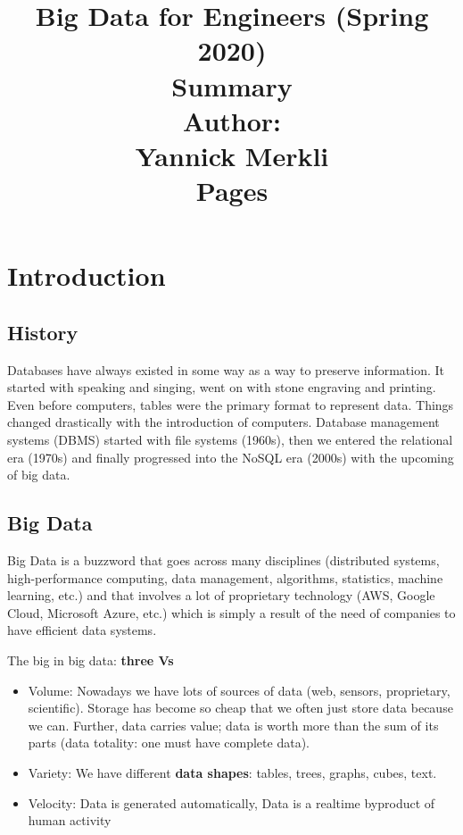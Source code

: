 \documentclass[11pt,oneside,a4paper]{article}
\title{
    \vspace*{0.0mm}
    \LARGE\bf\sf Big Data for Engineers (Spring 2020)
    \vspace*{10.0mm} \\
    \Huge\bf\sf Summary
    \vspace*{30.0mm} \\
    \normalsize
    \sf Author:\\[5pt]
    \sf Yannick Merkli\\ [5pt]
    \sf \pageref{lastpage} Pages
}
\date{}
\begin{document}
\maketitle
\thispagestyle{empty}
\raggedbottom
\clearpage


\clearpage
\setcounter{tocdepth}{2}
\tableofcontents
\clearpage
{}

\setlength\parindent{0pt}
\titlespacing{\subsection}{0pt}{2ex}{2ex}


\newpage

\section{Introduction}

\subsection{History}

Databases have always existed in some way as a way to preserve information. It started with speaking and singing, went on with stone engraving and printing. Even before computers, tables were the primary format to represent data. Things changed drastically with the introduction of computers. Database management systems (DBMS) started with file systems (1960s), then we entered the relational era (1970s) and finally progressed into the NoSQL era (2000s) with the upcoming of big data.

\subsection{Big Data}

Big Data is a buzzword that goes across many disciplines (distributed systems, high-performance computing, data management, algorithms, statistics, machine learning, etc.) and that involves a lot of proprietary technology (AWS, Google Cloud, Microsoft Azure, etc.) which is simply a result of the need of companies to have efficient data systems.

The big in big data: \textbf{three Vs}

\vspace{-\topsep}
\begin{itemize}
	\setlength{\itemsep}{0pt}
	\setlength{\parskip}{0pt}
	\item Volume: Nowadays we have lots of sources of data (web, sensors, proprietary, scientific). Storage has become so cheap that we often just store data because we can. Further, data carries value; data is worth more than the sum of its parts (data totality: one must have complete data).
	\item Variety: We have different \textbf{data shapes}: tables, trees, graphs, cubes, text.
	\item Velocity: Data is generated automatically, Data is a realtime byproduct of human activity
\end{itemize}
\end{document}
